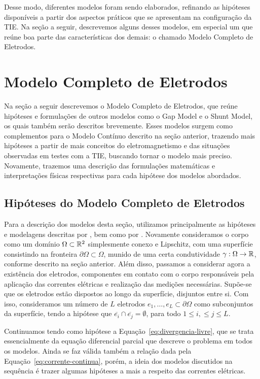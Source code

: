Desse modo, diferentes modelos foram sendo elaborados, refinando as hipóteses disponíveis a partir dos aspectos práticos que se apresentam na configuração da TIE. Na seção a seguir, descrevemos alguns desses modelos, em especial um que reúne boa parte das características dos demais: o chamado Modelo Completo de Eletrodos.

\section{Modelo Completo de Eletrodos} \label{sec:modelo-completo-eletrodos}

Na seção a seguir descrevemos o Modelo Completo de Eletrodos, que reúne hipóteses e formulações de outros modelos como o Gap Model e o Shunt Model, os quais também serão descritos brevemente. Esses modelos surgem como complementos para o Modelo Contínuo descrito na seção anterior, trazendo mais hipóteses a partir de mais conceitos do eletromagnetismo e das situações observadas em testes com a TIE, buscando tornar o modelo mais preciso. Novamente, trazemos uma descrição das formulações matemáticas e interpretações físicas respectivas para cada hipótese dos modelos abordados. 

\subsection{Hipóteses do Modelo Completo de Eletrodos}

Para a descrição dos modelos desta seção, utilizamos principalmente as hipóteses e modelagens descritas por , bem como por . Novamente consideramos o corpo como um domínio $\Omega \subset \mathbb{R}^2$ simplesmente conexo e Lipschitz, com uma superfície consistindo na fronteira $\partial \Omega \subset \Omega$,  munido de uma certa condutividade $\gamma : \Omega \to \mathbb{R}$, conforme descrito na seção anterior. Além disso, passamos a considerar agora a existência dos eletrodos, componentes em contato com o corpo responsáveis pela aplicação das correntes elétricas e realização das medições necessárias. Supõe-se que os eletrodos estão dispostos ao longo da superfície, disjuntos entre si. Com isso, consideramos um número de $L$ eletrodos $e_1,\dots,e_L\subset \partial \Omega$ como subconjuntos da superfície, tendo a hipótese que $\overline{e_i} \cap \overline{e_j} = \emptyset$, para todo $1\leq i, \leq j \leq L$. 

Continuamos tendo como hipótese a Equação~\eqref{eq:divergencia-livre}, que se trata essencialmente da equação diferencial parcial que descreve o problema em todos os modelos. Ainda se faz válida também a relação dada pela Equação~\eqref{eq:corrente-continua}, porém, a ideia dos modelos discutidos na sequência é trazer algumas hipóteses a mais a respeito das correntes elétricas.

